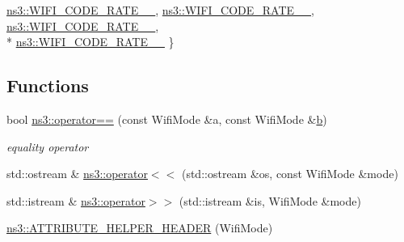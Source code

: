 \begin{DoxyCompactItemize}
\hyperlink{namespacens3_aeaf3a86fd4bdb7829955238fba43e2ada705b2eb134214c4f87c2b07dfb59046a}{ns3\+::\+W\+I\+F\+I\+\_\+\+C\+O\+D\+E\+\_\+\+R\+A\+T\+E\+\_\+\_}, 
\hyperlink{namespacens3_aeaf3a86fd4bdb7829955238fba43e2ada161e88df840a9d1ed66f6f8edd0d6415}{ns3\+::\+W\+I\+F\+I\+\_\+\+C\+O\+D\+E\+\_\+\+R\+A\+T\+E\+\_\+\_}, 
\hyperlink{namespacens3_aeaf3a86fd4bdb7829955238fba43e2ada66dfa017f6a74bcb72cdccfee778e90b}{ns3\+::\+W\+I\+F\+I\+\_\+\+C\+O\+D\+E\+\_\+\+R\+A\+T\+E\+\_\+\_}, 
\\*
\hyperlink{namespacens3_aeaf3a86fd4bdb7829955238fba43e2adaf0309d61b4cf97e5718f6d3b9fdba3aa}{ns3\+::\+W\+I\+F\+I\+\_\+\+C\+O\+D\+E\+\_\+\+R\+A\+T\+E\+\_\+\_}
 \}
\end{DoxyCompactItemize}
\subsection*{Functions}
\begin{DoxyCompactItemize}
\item 
bool \hyperlink{namespacens3_aae78c1f33c9ff6b5b15dfb2551eaf6a0}{ns3\+::operator==} (const Wifi\+Mode \&a, const Wifi\+Mode \&\hyperlink{lte__pathloss_8m_a21ad0bd836b90d08f4cf640b4c298e7c}{b})
\begin{DoxyCompactList}\small\item\em equality operator \end{DoxyCompactList}\item 
std\+::ostream \& \hyperlink{namespacens3_a57863964b1cdf873dff3b24df1f0c04b}{ns3\+::operator$<$$<$} (std\+::ostream \&os, const Wifi\+Mode \&mode)
\item 
std\+::istream \& \hyperlink{namespacens3_ad5530945ff978ccc2497d99cd67e0588}{ns3\+::operator$>$$>$} (std\+::istream \&is, Wifi\+Mode \&mode)
\item 
\hyperlink{namespacens3_a1d2bc65c5bb8ed2da37c6dfcf183947f}{ns3\+::\+A\+T\+T\+R\+I\+B\+U\+T\+E\+\_\+\+H\+E\+L\+P\+E\+R\+\_\+\+H\+E\+A\+D\+ER} (Wifi\+Mode)
\end{DoxyCompactItemize}
